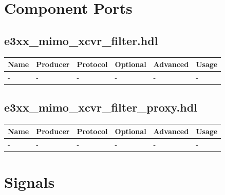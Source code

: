 \documentclass{article}
\def\comp{e3xx\_mimo\_xcvr\_filter}
\def\proxy{e3xx\_mimo\_xcvr\_filter\_proxy}
\def\comp{e3xx\_mimo\_xcvr\_filter}
\begin{document}
\begin{landscape}
\section*{Component Ports}
\subsection*{\comp.hdl}
    \begin{scriptsize}
        \begin{tabular}{|p{2cm}|p{1.5cm}|p{4cm}|p{1.5cm}|p{1.5cm}|p{10.36cm}|}
        \hline
        \rowcolor{blue}
        Name & Producer & Protocol           & Optional & Advanced & Usage                  \\
        \hline
        -    & -        & -                  & -        & -        & - \\
        \hline
        \end{tabular}
	\end{scriptsize}
\subsection*{\proxy.hdl}
    \begin{scriptsize}
        \begin{tabular}{|p{2cm}|p{1.5cm}|p{4cm}|p{1.5cm}|p{1.5cm}|p{10.36cm}|}
        \hline
        \rowcolor{blue}
        Name & Producer & Protocol           & Optional & Advanced & Usage                  \\
        \hline
        -    & -        & -                  & -        & -        & - \\
        \hline
        \end{tabular}
	\end{scriptsize}

\section*{Signals}

\end{landscape}
\end{document}
